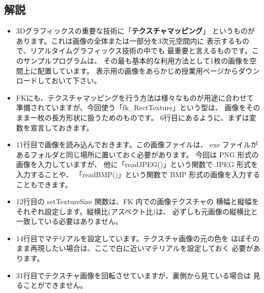 \subsection*{解説}
\begin{itemize}
 \item 3Dグラフィックスの重要な技術に「\textbf{テクスチャマッピング}」
	というものがあります。これは画像の全体または一部分を3次元空間内に
	表示するもので、リアルタイムグラフィックス技術の中でも
	最重要と言えるものです。このサンプルプログラムは、
	その最も基本的な利用方法として1枚の画像を空間上に配置しています。
	表示用の画像をあらかじめ授業用ページからダウンロードしておいて下さい。

 \item FKにも、テクスチャマッピングを行う方法は様々なものが用途に合わせて
	準備されていますが、今回使う「fk\_RectTexture」という型は、
	画像をそのまま一枚の長方形状に扱うためのものです。
	6行目にあるように、まずは変数を宣言しておきます。

 \item 11行目で画像を読み込んでおきます。この画像ファイルは、
	exe ファイルがあるフォルダと同じ場所に置いておく必要があります。
	今回は PNG 形式の画像を入力していますが、
	他に「readJPEG()」という関数で JPEG 形式を入力することや、
	「readBMP()」という関数で BMP 形式の画像を入力することもできます。

 \item 12行目の setTextureSize 関数は、FK 内での画像テクスチャの
	横幅と縦幅をそれぞれ設定します。縦横比(アスペクト比)は、
	必ずしも元画像の縦横比と一致している必要はありません。

 \item 14行目でマテリアルを設定しています。テクスチャ画像の元の色を
	ほぼそのまま再現したい場合は、ここで白に近いマテリアルを設定しておく
	必要があります。

 \item 31行目でテクスチャ画像を回転させていますが、裏側から見ている場合は
	見ることができません。
\end{itemize}
